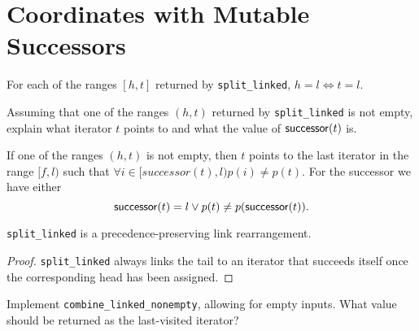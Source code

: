 \chapter{Coordinates with Mutable Successors}

\begin{lemma}
	For each of the ranges $[h, t]$ returned by \verb|split_linked|, $h = l \Leftrightarrow t = l$.
\end{lemma}

\begin{exercise}
	Assuming that one of the ranges $(h, t)$ returned by \verb|split_linked| is not empty, explain what
	iterator $t$ points to and what the value of $\mathsf{successor}(t)$ is.
\end{exercise}

\begin{solution}
	If one of the ranges $(h, t)$ is not empty, then $t$ points to the last iterator in the range $[f, l)$ such
	that $\forall i \in [successor(t), l) p(i) \neq p(t)$. For the successor we have either
	\[ \mathsf{successor}(t) = l \vee p(t) \neq p(\mathsf{successor}(t)). \]
\end{solution}

\begin{lemma}
	\verb|split_linked| is a precedence-preserving link rearrangement.
\end{lemma}

\begin{proof}
	\verb|split_linked| always links the tail to an iterator that succeeds itself once the corresponding
	head has been assigned.
\end{proof}

\begin{exercise}
	Implement \verb|combine_linked_nonempty|, allowing for empty inputs. What value should be returned as the
	last-visited iterator?
\end{exercise}


